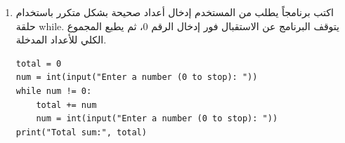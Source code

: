 \documentclass[14pt]{extarticle}
\begin{document}
\begin{enumerate}[itemsep=3em]
\item
اكتب برنامجاً يطلب من المستخدم إدخال أعداد صحيحة بشكل متكرر باستخدام حلقة \textenglish{while}. يتوقف البرنامج عن الاستقبال فور إدخال الرقم 0، ثم يطبع المجموع الكلي للأعداد المدخلة.

\ifwithsols
\begin{boxSolution}
\begin{english}
\begin{verbatim}
total = 0
num = int(input("Enter a number (0 to stop): "))
while num != 0:
    total += num
    num = int(input("Enter a number (0 to stop): "))
print("Total sum:", total)
\end{verbatim}
\end{english}
\end{boxSolution}
\fi

\end{enumerate}
\clearpage
\end{document}
